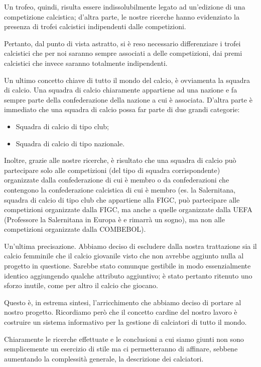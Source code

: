Un trofeo, quindi, risulta essere indissolubilmente legato ad un'edizione di una competizione
calcistica; d'altra parte, le nostre ricerche hanno evidenziato la presenza di trofei calcistici
indipendenti dalle competizioni.

Pertanto, dal punto di vista astratto, si è reso necessario differenziare i trofei calcistici
che per noi saranno sempre associati a delle competizioni, dai premi calcistici che invece
saranno totalmente indipendenti.

Un ultimo concetto chiave di tutto il mondo del calcio, è ovviamenta la squadra di calcio.
Una squadra di calcio chiaramente appartiene ad una nazione e fa sempre parte della
confederazione della nazione a cui è associata.
D'altra parte è immediato che una squadra di calcio possa far parte di due grandi categorie:
\begin{itemize}
	\item Squadra di calcio di tipo club;
	\item Squadra di calcio di tipo nazionale.
\end{itemize}

Inoltre, grazie alle nostre ricerche, è risultato che una squadra di calcio può partecipare
solo alle competizioni (del tipo di squadra corrispondente) organizzate dalla confederazione
di cui è membro o da confederazioni che contengono la confederazione calcistica di cui
è membro (es. la Salernitana, squadra di calcio di tipo club che appartiene alla FIGC,
può partecipare alle competizioni organizzate dalla FIGC, ma anche a quelle organizzate
dalla UEFA (Professore la Salernitana in Europa è e rimarrà un sogno),
ma non alle competizioni organizzate dalla COMBEBOL).

Un'ultima precisazione. Abbiamo deciso di escludere dalla nostra trattazione sia il calcio
femminile che il calcio giovanile visto che non avrebbe aggiunto nulla al progetto in questione.
Sarebbe stato comunque gestibile in modo essenzialmente identico aggiungendo qualche attributo
aggiuntivo; è stato pertanto ritenuto uno sforzo inutile, come per altro il calcio che giocano.
\bigskip
\bigskip

Questo è, in estrema sintesi, l'arricchimento che abbiamo deciso di portare al nostro progetto.
Ricordiamo però che il concetto cardine del nostro lavoro è costruire un sistema informativo
per la gestione di calciatori di tutto il mondo.

Chiaramente le ricerche effettuate e le conclusioni a cui siamo giunti non sono semplicemente
un esercizio di stile ma ci permetteranno di affinare, sebbene aumentando la complessità
generale, la descrizione dei calciatori.

